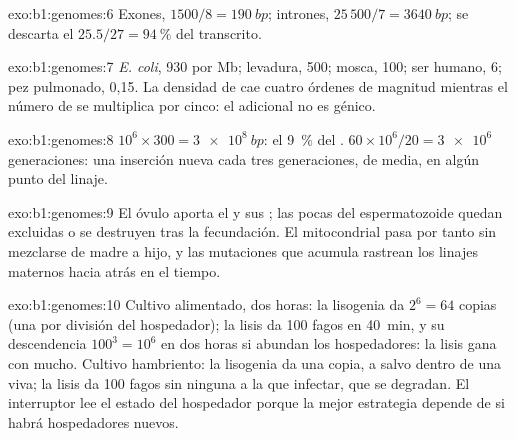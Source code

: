 \begin{solution}{exo:b1:genomes:6}
Exones, $1500/8 = \qty{190}{bp}$; intrones, $25\,500/7 = \qty{3640}{bp}$;
se descarta el $25.5/27 = \qty{94}{\%}$ del transcrito.
\end{solution}

\begin{solution}{exo:b1:genomes:7}
\emph{E. coli}, 930  por Mb; levadura, 500; mosca, 100; ser humano, 6;
pez pulmonado, 0,15. La densidad de  cae cuatro órdenes de magnitud
mientras el número de  se multiplica por cinco: el  adicional no es
génico.
\end{solution}

\begin{solution}{exo:b1:genomes:8}
$10^6\times 300 = \qty{3e8}{bp}$: el \qty{9}{\%} del . $60\times
10^6/20 = \num{3e6}$ generaciones: una inserción nueva cada tres
generaciones, de media, en algún punto del linaje.
\end{solution}

\begin{solution}{exo:b1:genomes:9}
El óvulo aporta el  y sus ; las pocas  del
espermatozoide quedan excluidas o se destruyen tras la fecundación. El 
mitocondrial pasa por tanto sin mezclarse de madre a hijo, y las mutaciones
que acumula rastrean los linajes maternos hacia atrás en el tiempo.
\end{solution}

\begin{solution}{exo:b1:genomes:10}
Cultivo alimentado, dos horas: la lisogenia da $2^6 = 64$ copias (una por
división del hospedador); la lisis da 100 fagos en \qty{40}{min}, y su
descendencia $100^3 = 10^6$ en dos horas si abundan los hospedadores: la
lisis gana con mucho. Cultivo hambriento: la lisogenia da una copia, a salvo
dentro de una  viva; la lisis da 100 fagos sin ninguna  a la que
infectar, que se degradan. El interruptor lee el estado del hospedador
porque la mejor estrategia depende de si habrá hospedadores nuevos.
\end{solution}

